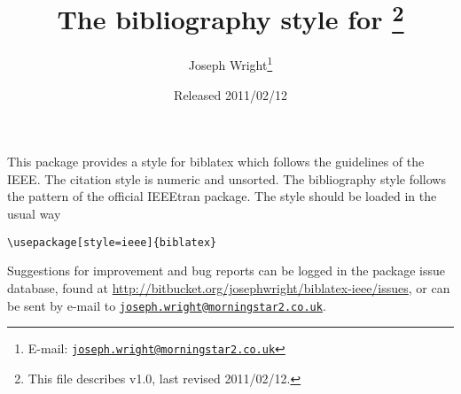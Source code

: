 \documentclass[a4paper]{article}
\author{Joseph Wright\thanks{E-mail: 
  \href{mailto:joseph.wright@morningstar2.co.uk}
  {\texttt{joseph.wright@morningstar2.co.uk}}}}
\title{The \pkg{ieee} bibliography style for \pkg{biblatex}%
  \footnote{This file describes v1.0, last revised 2011/02/12.}}
\date{Released 2011/02/12}
\providecommand*\pkg[1]{\textsf{#1}}
\begin{document}
\maketitle

This package provides a style for \pkg{biblatex} which follows the
guidelines of the IEEE. The citation style is numeric and unsorted. The
bibliography style follows the pattern of the official \pkg{IEEEtran}
package. The style should be loaded in the usual way
\begin{verbatim}
\usepackage[style=ieee]{biblatex}
\end{verbatim}

Suggestions for improvement and bug reports can be logged in the package
issue database, found at
\url{http://bitbucket.org/josephwright/biblatex-ieee/issues}, or can
be sent by e-mail to 
\href{mailto:joseph.wright@morningstar2.co.uk}
  {\texttt{joseph.wright@morningstar2.co.uk}}.

\nocite{*}

\printbibliography
\end{document}
